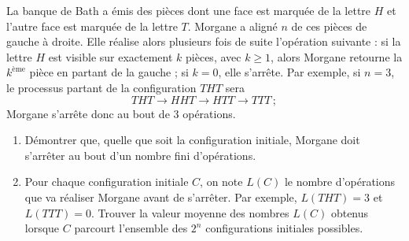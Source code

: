 La banque de Bath a émis des pièces dont une face est marquée de la lettre $H$ et l'autre face est marquée de
la lettre $T$. Morgane a aligné $n$ de ces pièces de gauche à droite. Elle réalise alors plusieurs fois de suite
l'opération suivante : si la lettre $H$ est visible sur exactement $k$ pièces, avec $k \geqslant 1$, alors
Morgane retourne la $k^{\text{ème}}$ pièce en partant de la gauche ; si $k = 0$, elle s'arrête. Par exemple,
si $n = 3$, le processus partant de la configuration $THT$ sera
\[
THT \to HHT \to HTT \to TTT\,;
\]
Morgane s'arrête donc au bout de $3$ opérations.
\begin{enumerate}
  \item[(a)] Démontrer que, quelle que soit la configuration initiale, Morgane doit s'arrêter au bout d'un
  nombre fini d'opérations.
  \item[(b)] Pour chaque configuration initiale $C$, on note $L(C)$ le nombre d'opérations que va réaliser
  Morgane avant de s'arrêter. Par exemple, $L(THT) = 3$ et $L(TTT) = 0$. Trouver la valeur moyenne des nombres
  $L(C)$ obtenus lorsque $C$ parcourt l'ensemble des $2^n$ configurations initiales possibles.
\end{enumerate}
